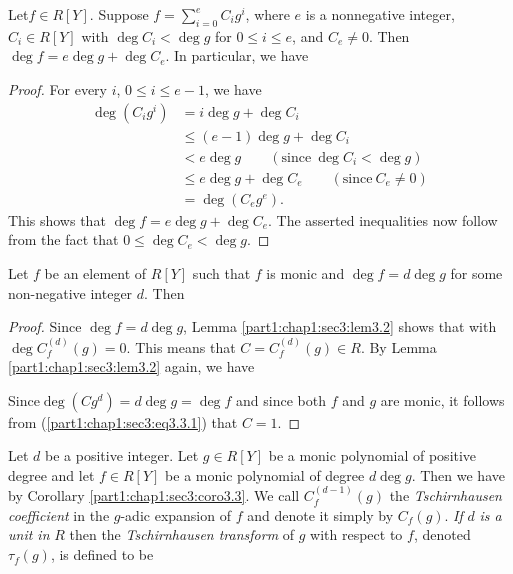 \setcounter{thm}{1}
\begin{lemma}\label{part1:chap1:sec3:lem3.2}
  Let\pageoriginale $f \in R [Y]$. Suppose $f= \displaystyle{\sum^e_{i=0}} C_i g^i$, where $e$ is a nonnegative integer, $C_i \in R[Y]$ with $\deg C_i < \deg g$ for $0 \leq i \leq e$, and $C_e \neq 0$. Then $\deg f = e \deg g + \deg C_e$. In particular, we have
\end{lemma}

\begin{proof}
  For every $i$, $0 \leq i \leq e-1$, we have
  \begin{align*}
    \deg (C_i g^i) & = i \deg g + \deg C_i\\
    & \leq (e-1) \deg g + \deg C_i\\
    & < e \deg g\qquad (\text{since}~ \deg C_i < \deg g)\\
    & \leq e \deg g + \deg C_e \qquad (\text{since}~ C_e \neq 0)\\
    & = \deg (C_e g^e).
  \end{align*}
  This shows that $\deg f =e \deg g + \deg C_e$. The asserted inequalities now follow from the fact that $0 \leq \deg C_e < \deg g$.
\end{proof}

\begin{coro}\label{part1:chap1:sec3:coro3.3}
  Let $f$ be an element of $R[Y]$ such that $f$ is monic and $\deg f = d \deg g$ for some non-negative integer $d$. Then
\end{coro}

\begin{proof}
  Since $\deg f= d \deg g$, Lemma \ref{part1:chap1:sec3:lem3.2} shows that
with $\deg C_f^{(d)}(g)=0$. This means that $C= C_f^{(d)} (g) \in R$. By Lemma \ref{part1:chap1:sec3:lem3.2} again, we have

Since\pageoriginale $\deg (C g^d) =d \deg g = \deg f$ and since both $f$ and $g$ are monic, it follows from (\ref{part1:chap1:sec3:eq3.3.1}) that $C=1$.
\end{proof}

\begin{defi}\label{part1:chap1:sec3:def3.4}
  Let $d$ be a positive integer. Let $g \in R[Y]$ be a monic polynomial of positive degree and let $f \in R [Y]$ be a monic polynomial of degree $d \deg g$. Then we have
by Corollary \ref{part1:chap1:sec3:coro3.3}. We call $C_f^{(d-1)}(g)$ the \textit{Tschirnhausen coefficient} in the  $g$-adic expansion of $f$ and denote it simply by $C_f (g)$. {\em If} $d$ {\em is a unit in} $R$ then the {\em Tschirnhausen transform} of $g$ with respect to $f$, denoted $\tau_f (g)$, is defined to be 
\end{defi}

